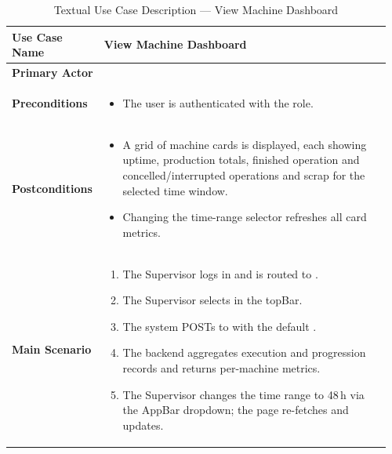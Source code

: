 \begin{longtable}{@{} P{0.21\linewidth} P{0.75\linewidth} @{}}
            
      \caption{Textual Use Case Description --- View Machine Dashboard}
      \label{tab:s4-uc-scan-component-s4} \\
      \toprule
      \endfirsthead
      \midrule
      \endhead
      
      \bottomrule
      \endlastfoot
      
      \textbf{Use Case Name}  & View Machine Dashboard   \\
      \midrule
      \textbf{Primary Actor}  &  \\
      \midrule
      \textbf{Preconditions}  &                          
      \begin{itemize}[nosep, leftmargin=*]
      \item The user is authenticated with the  role.
      \end{itemize} \\
      \midrule
      \textbf{Postconditions} &                          
      \begin{itemize}[nosep, leftmargin=*]
      \item A grid of machine cards is displayed, each showing uptime, production
      totals, finished operation and concelled/interrupted operations and scrap for the selected time window.
      \item Changing the time-range selector refreshes all card metrics.
      \end{itemize} \\
      \midrule
      \textbf{Main Scenario}  &                          
      \begin{enumerate}[nosep, leftmargin=*]
      \item The Supervisor logs in and is routed to .
      \item The Supervisor selects  in the topBar.
      \item The system POSTs to 
      with the default .
      \item The backend aggregates execution and progression records and returns
      per-machine metrics.
      \item The Supervisor changes the time range to 48\,h via the AppBar
      dropdown; the page re-fetches and updates.
      \end{enumerate} \\
            
\end{longtable}

